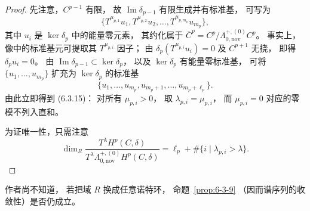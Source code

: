 \begin{proof}
先注意，$C^{p-1}$ 有限，
故 $\operatorname{Im}\delta_{p-1}$
有限生成并有标准基，
可写为
\[
\{T^{\mu_{p,1}}u_1,
T^{\mu_{p,2}}u_2,\ldots,
T^{\mu_{p,m_p}}u_{m_p}\},
\]
其中 $u_i$ 是 $\ker\delta_p$
中的能量零元素，
其约化属于 $\overline C^p
=C^p/\Lambda_{0,\mathrm{nov}}^{+,(0)}C^p$。
事实上，像中的标准基元可提取其
$T^{\mu_{p,i}}$ 因子；
由 $\delta_p(T^{\mu_{p,i}}u_i)=0$
及 $C^{p+1}$ 无挠，
即得 $\delta_pu_i=0$。
由
$\operatorname{Im}\delta_{p-1}
\subset\ker\delta_p$，
以及 $\ker\delta_p$
有能量零标准基，
可将 $\{u_1,\ldots,u_{m_p}\}$
扩充为 $\ker\delta_p$ 的标准基
\[
\{u_1,\ldots,u_{m_p},
u_{m_p+1},\ldots,u_{m_p+\ell_p}\}.
\]
由此立即得到 (6.3.15)：
对所有 $\mu_{p,i}>0$，
取 $\lambda_{p,i}=\mu_{p,i}$，
而 $\mu_{p,i}=0$ 对应的零模不列入直和。

为证唯一性，只需注意
\[
\dim_R
\frac{T^\lambda H^p(C,\delta)}
{T^\lambda\Lambda_{0,\mathrm{nov}}^{+,(0)}
H^p(C,\delta)}
=\ell_p+\#\{i\mid\lambda_{p,i}>\lambda\}.
\]
\end{proof}

作者尚不知道，
若把域 $R$ 换成任意诺特环，
命题~\ref{prop:6-3-9}
（因而谱序列的收敛性）是否仍成立。
